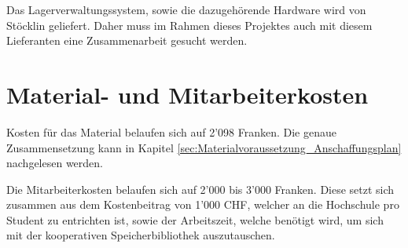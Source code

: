 Das Lagerverwaltungssystem, sowie die dazugehörende Hardware wird von Stöcklin geliefert. Daher muss im Rahmen dieses Projektes auch mit diesem Lieferanten eine Zusammenarbeit gesucht werden.

\section{Material- und Mitarbeiterkosten}
Kosten für das Material belaufen sich auf 2'098 Franken. Die genaue Zusammensetzung kann in Kapitel \ref{sec:Materialvoraussetzung_Anschaffungsplan} nachgelesen werden.

Die Mitarbeiterkosten belaufen sich auf 2'000 bis 3'000 Franken. Diese setzt sich zusammen aus dem Kostenbeitrag von 1'000 CHF, welcher an die Hochschule pro Student zu entrichten ist, sowie der Arbeitszeit, welche benötigt wird, um sich mit der kooperativen Speicherbibliothek auszutauschen.
